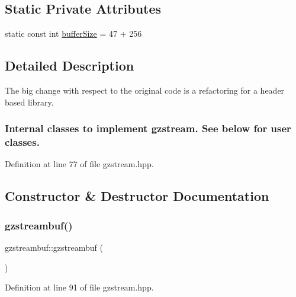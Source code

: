 \subsection*{Static Private Attributes}
\begin{DoxyCompactItemize}
\item 
static const int \hyperlink{classgzstreambuf_a46652e438b6c4e9174ca79c171b1a140}{buffer\+Size} = 47 + 256
\end{DoxyCompactItemize}


\subsection{Detailed Description}
The big change with respect to the original code is a refactoring for a header based library. 



 \subsubsection*{Internal classes to implement gzstream. See below for user classes. }

Definition at line 77 of file gzstream.\+hpp.



\subsection{Constructor \& Destructor Documentation}
\mbox{\label{classgzstreambuf_afa212e5c8f1ec6a63caec17e77d6b432}} 
\subsubsection{\texorpdfstring{gzstreambuf()}{gzstreambuf()}}
{\footnotesize\ttfamily gzstreambuf\+::gzstreambuf (\begin{DoxyParamCaption}{ }\end{DoxyParamCaption})\hspace{0.3cm}{\ttfamily [inline]}}



Definition at line 91 of file gzstream.\+hpp.

\mbox{\label{classgzstreambuf_a91aade68db7be79b082ebf291e5802e3}} 
